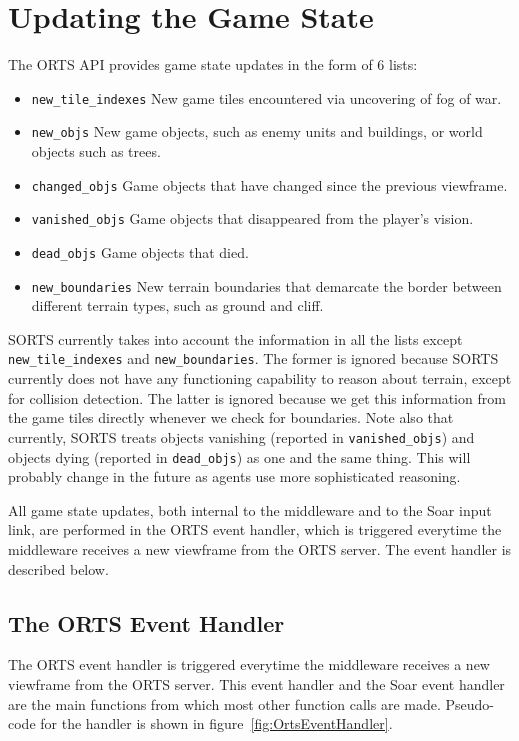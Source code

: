 \section{Updating the Game State}

The ORTS API provides game state updates in the form of 6 lists:

\begin{itemize}
  \item \verb|new_tile_indexes| New game tiles encountered via
  uncovering of fog of war.
  \item \verb|new_objs| New game objects, such as enemy units and
  buildings, or world objects such as trees.
  \item \verb|changed_objs| Game objects that have changed since the
  previous viewframe.
  \item \verb|vanished_objs| Game objects that disappeared from the
  player's vision.
  \item \verb|dead_objs| Game objects that died.
  \item \verb|new_boundaries| New terrain boundaries that demarcate
  the border between different terrain types, such as ground and cliff.
\end{itemize}

SORTS currently takes into account the information in all
the lists except \verb|new_tile_indexes| and
\verb|new_boundaries|. The former is ignored because SORTS
currently does not have any functioning capability to reason about
terrain, except for collision detection. The latter is ignored because
we get this information from the game tiles directly whenever we check
for boundaries. Note also that currently, SORTS treats objects vanishing
(reported in \verb|vanished_objs|) and objects dying (reported in
\verb|dead_objs|) as one and the same thing. This will probably change
in the future as agents use more sophisticated reasoning.

All game state updates, both internal to the middleware and to the Soar
input link, are performed in the ORTS event handler, which is triggered
everytime the middleware receives a new viewframe from the ORTS server.
The event handler is described below.

\subsection{The ORTS Event Handler}
\label{sec:OrtsEventHandler}

The ORTS event handler is triggered everytime the middleware receives
a new viewframe from the ORTS server. This event handler and the
Soar event handler are the main functions from which most other
function calls are made. Pseudo-code for the handler is shown in
figure~\ref{fig:OrtsEventHandler}.

